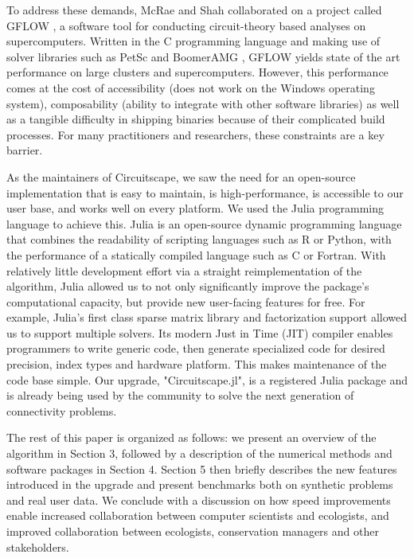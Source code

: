 \documentclass{juliacon}
\begin{document}
To address these demands, McRae and Shah collaborated on  a project called GFLOW \cite{leonard2017gflow}, a software tool for conducting circuit-theory based analyses on supercomputers. Written in the C programming language and making use of solver libraries such as PetSc \cite{balay2004petsc} and BoomerAMG \cite{yang2002boomeramg}, GFLOW yields state of the art performance on large clusters and supercomputers. However, this performance comes at the cost of accessibility (does not work on the Windows operating system), composability (ability to integrate with other software libraries) as well as a tangible difficulty in shipping binaries because of their complicated build processes. For many practitioners and researchers, these constraints are a key barrier.

As the maintainers of Circuitscape, we saw the need for an open-source implementation that is easy to maintain, is high-performance, is accessible to our user base, and works well on every platform. We used the Julia programming language \cite{bezanson2017julia} to achieve this. Julia is an open-source dynamic programming language that combines the readability of scripting languages such as R or Python, with the performance of a statically compiled language such as C or Fortran. With relatively little development effort via a straight reimplementation of the algorithm, Julia allowed us to not only significantly improve the package's computational capacity, but provide new user-facing features for free. For example, Julia's first class sparse matrix library and factorization support allowed us to support multiple solvers. Its modern Just in Time (JIT) compiler enables programmers to write generic code, then generate specialized code for desired precision, index types and hardware platform. This makes maintenance of the code base simple. Our upgrade, "Circuitscape.jl", is a registered Julia package and is already being used by the community to solve the next generation of connectivity problems.  

The rest of this paper is organized as follows: we present an overview of the algorithm in Section 3, followed by a description of the numerical methods and software packages in Section 4. Section 5 then briefly describes the new features introduced in the upgrade and present benchmarks both on synthetic problems and real user data. We conclude with a discussion on how speed improvements enable increased collaboration between computer scientists and ecologists, and improved collaboration between ecologists, conservation managers and other stakeholders. 
\end{document}
